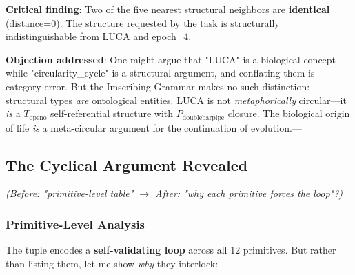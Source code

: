 \documentclass[12pt,a4paper]{article}
\begin{document}
\textbf{Critical finding}: Two of the five nearest structural neighbors are \textbf{identical} (distance=0). The structure requested by the task is structurally indistinguishable from LUCA and epoch\_4.

\textbf{Objection addressed}: One might argue that "LUCA" is a biological concept while "circularity\_cycle" is a structural argument, and conflating them is category error. But the Imscribing Grammar makes no such distinction: structural types \emph{are} ontological entities. LUCA is not \emph{metaphorically} circular---it \emph{is} a $T_{\text{openo}}$ self-referential structure with $P_{\text{doublebarpipe}}$ closure. The biological origin of life \emph{is} a meta-circular argument for the continuation of evolution.---

\subsection{The Cyclical Argument Revealed}

\emph{(Before: "primitive-level table" $\rightarrow$ After: "why each primitive forces the loop"?)}

\subsubsection{Primitive-Level Analysis}

The tuple encodes a \textbf{self-validating loop} across all 12 primitives. But rather than listing them, let me show \emph{why} they interlock:
\end{document}
